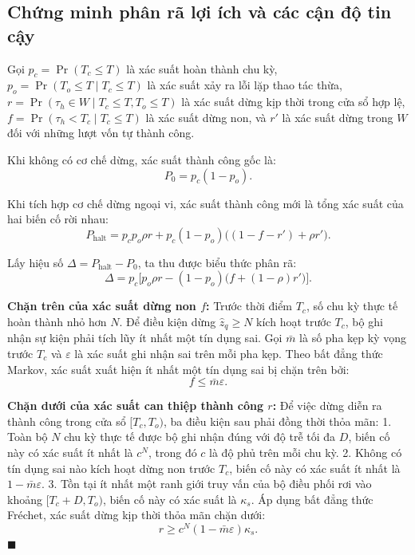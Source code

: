 \subsection{Chứng minh phân rã lợi ích và các cận độ tin cậy}
Gọi $p_c = \Pr(T_c \le T)$ là xác suất hoàn thành chu kỳ, $p_o = \Pr(T_o \le T \mid T_c \le T)$ là xác suất xảy ra lỗi lặp thao tác thừa, $r = \Pr(\tau_h \in W \mid T_c \le T, T_o \le T)$ là xác suất dừng kịp thời trong cửa sổ hợp lệ, $f = \Pr(\tau_h < T_c \mid T_c \le T)$ là xác suất dừng non, và $r'$ là xác suất dừng trong $W$ đối với những lượt vốn tự thành công.

Khi không có cơ chế dừng, xác suất thành công gốc là:
\begin{equation}
P_0 = p_c (1 - p_o).
\end{equation}

Khi tích hợp cơ chế dừng ngoại vi, xác suất thành công mới là tổng xác suất của hai biến cố rời nhau:
\begin{equation}
P_{\mathrm{halt}} = p_c p_o \rho r + p_c (1 - p_o) \big( (1 - f - r') + \rho r' \big).
\end{equation}

Lấy hiệu số $\Delta = P_{\mathrm{halt}} - P_0$, ta thu được biểu thức phân rã:
\begin{equation}
\Delta = p_c \Big[ p_o \rho r - (1 - p_o)\big(f + (1 - \rho)r'\big) \Big].
\end{equation}

\textbf{Chặn trên của xác suất dừng non $f$:}
Trước thời điểm $T_c$, số chu kỳ thực tế hoàn thành nhỏ hơn $N$. Để điều kiện dừng $\hat z_q \ge N$ kích hoạt trước $T_c$, bộ ghi nhận sự kiện phải tích lũy ít nhất một tín dụng sai. Gọi $\bar m$ là số pha kẹp kỳ vọng trước $T_c$ và $\varepsilon$ là xác suất ghi nhận sai trên mỗi pha kẹp. Theo bất đẳng thức Markov, xác suất xuất hiện ít nhất một tín dụng sai bị chặn trên bởi:
\begin{equation}
f \le \bar m \varepsilon.
\end{equation}

\textbf{Chặn dưới của xác suất can thiệp thành công $r$:}
Để việc dừng diễn ra thành công trong cửa sổ $[T_c, T_o)$, ba điều kiện sau phải đồng thời thỏa mãn:
1. Toàn bộ $N$ chu kỳ thực tế được bộ ghi nhận đúng với độ trễ tối đa $D$, biến cố này có xác suất ít nhất là $c^N$, trong đó $c$ là độ phủ trên mỗi chu kỳ.
2. Không có tín dụng sai nào kích hoạt dừng non trước $T_c$, biến cố này có xác suất ít nhất là $1 - \bar m \varepsilon$.
3. Tồn tại ít nhất một ranh giới truy vấn của bộ điều phối rơi vào khoảng $[T_c + D, T_o)$, biến cố này có xác suất là $\kappa_s$.
Áp dụng bất đẳng thức Fréchet, xác suất dừng kịp thời thỏa mãn chặn dưới:
\begin{equation}
r \ge c^N (1 - \bar m \varepsilon) \kappa_s.
\end{equation}
$\blacksquare$

